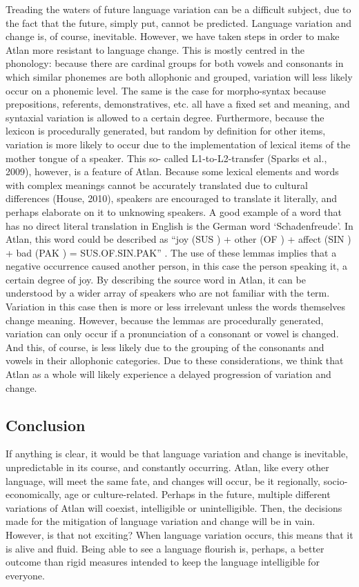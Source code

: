 Treading the waters of future language variation can be a difficult subject, due to the fact that the future, simply put, cannot be predicted. Language variation and change is, of course, inevitable. However, we have taken steps in order to make Atlan more resistant to language change. This is mostly centred in the phonology: because there are cardinal groups for both vowels and consonants in which similar phonemes are both allophonic and grouped, variation will less likely occur on a phonemic level. The same is the case for morpho-syntax because prepositions, referents, demonstratives, etc. all have a fixed set and meaning, and syntaxial variation is allowed to a certain degree. Furthermore, because the lexicon is procedurally generated, but random by definition for other items, variation is more likely to occur due to the implementation of lexical items of the mother tongue of a speaker. This so- called L1-to-L2-transfer (Sparks et al., 2009), however, is a feature of Atlan. Because some lexical elements and words with complex meanings cannot be accurately translated due to cultural differences (House, 2010), speakers are encouraged to translate it literally, and perhaps elaborate on it to unknowing speakers. A good example of a word that has no direct literal translation in English is the German word ‘Schadenfreude’. In Atlan, this word could be described as “joy (SUS \sus) + other (OF \of) + affect (SIN \Atlansin) + bad (PAK \pak) = SUS.OF.SIN.PAK” \sus \of \Atlansin \pak. The use of these lemmas implies that a negative occurrence caused another person, in this case the person speaking it, a certain degree of joy. By describing the source word in Atlan, it can be understood by a wider array of speakers who are not familiar with the term. Variation in this case then is more or less irrelevant unless the words themselves change meaning. However, because the lemmas are procedurally generated, variation can only occur if a pronunciation of a consonant or vowel is changed. And this, of course, is less likely due to the grouping of the consonants and vowels in their allophonic categories. Due to these considerations, we think that Atlan as a whole will likely experience a delayed progression of variation and change.

\subsection{Conclusion}

If anything is clear, it would be that language variation and change is inevitable, unpredictable in its course, and constantly occurring. Atlan, like every other language, will meet the same fate, and changes will occur, be it regionally, socio-economically, age or culture-related. Perhaps in the future, multiple different variations of Atlan will coexist, intelligible or unintelligible. Then, the decisions made for the mitigation of language variation and change will be in vain. However, is that not exciting? When language variation occurs, this means that it is alive and fluid. Being able to see a language flourish is, perhaps, a better outcome than rigid measures intended to keep the language intelligible for everyone.


